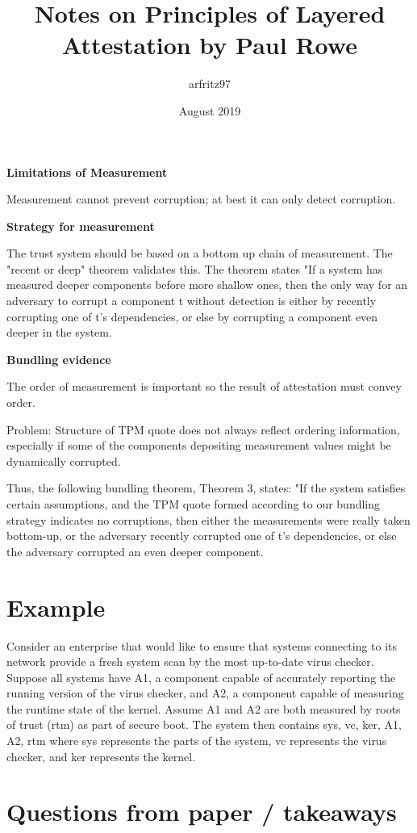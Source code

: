 \documentclass{article}
\title{Notes on Principles of Layered Attestation by Paul Rowe}
\author{arfritz97 }
\date{August 2019}
\begin{document}
\textbf {Limitations of Measurement}

Measurement cannot prevent corruption; at best it can only detect corruption.

\textbf {Strategy for measurement}

The trust system should be based on a bottom up chain of measurement. The "recent or deep" theorem validates this. The theorem states "If a system has measured deeper components before more shallow ones, then the only way for an adversary to corrupt a component t without detection is either by recently corrupting one of t's dependencies, or else by corrupting a component even deeper in the system. 

\textbf {Bundling evidence}

The order of measurement is important so the result of attestation must convey order. 

Problem: Structure of TPM quote does not always reflect ordering information, especially if some of the components depositing measurement values might be dynamically corrupted. 

Thus, the following bundling theorem, Theorem 3, states: "If the system satisfies certain assumptions, and the TPM quote formed according to our bundling strategy indicates no corruptions, then either the measurements were really taken bottom-up, or the adversary recently corrupted one of t's dependencies, or else the adversary corrupted an even deeper component. 

\section {Example}

Consider an enterprise that would like to ensure that systems connecting to its network provide a fresh system scan by the most up-to-date virus checker. Suppose all systems have A1, a component capable of accurately reporting the running version of the virus checker, and A2, a component capable of measuring the runtime state of the kernel. Assume A1 and A2 are both measured by roots of trust (rtm) as part of secure boot. The system then contains {sys, vc, ker, A1, A2, rtm} where sys represents the parts of the system, vc represents the virus checker, and ker represents the kernel.

\section {Questions from paper / takeaways}
\end{document}
